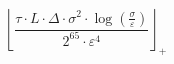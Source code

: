 \[\left\lfloor \frac{\tau \cdot L \cdot \Delta \cdot \sigma^{2} \cdot \log\left(\frac{\sigma}{\varepsilon}\right)}{2^{65} \cdot \varepsilon^{4}} \right\rfloor_{+}\]
